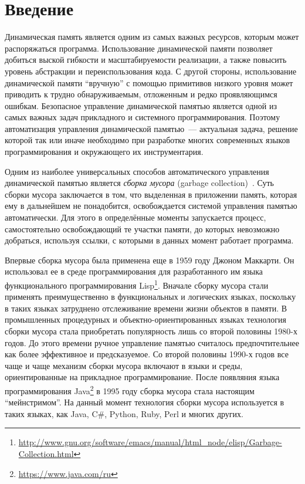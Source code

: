 \setcounter{page}{4}
\section*{Введение}

Динамическая память является одним из самых важных ресурсов, которым может распоряжаться программа. Использование
динамической памяти позволяет добиться выской гибкости и масштабируемости реализации, а также повысить уровень
абстракции и переиспользования кода. С другой стороны, использование динамической памяти ``вручную'' с помощью
примитивов низкого уровня может приводить к трудно обнаруживаемым, отложенным и редко проявляющимся ошибкам. 
Безопасное управление динамической памятью является одной из самых важных задач прикладного и системного программирования. 
Поэтому автоматизация управления динамической памятью~--- актуальная задача, решение которой так или иначе необходимо при
разработке многих современных языков программирования и окружающего их инструментария.

Одним из наиболее универсальных способов автоматического управления динамической памятью является \emph{сборка мусора} 
(garbage collection)~\cite{GCBook}. Суть сборки мусора заключается в том, что выделенная в приложении память, 
которая ему в дальнейшем не понадобится, освобождается системой управления памятью автоматически. Для этого в 
определённые моменты запускается процесс, самостоятельно освобождающий те участки памяти, до которых невозможно
добраться, используя ссылки, с которыми в данных момент работает программа.
 
Впервые сборка мусора была применена еще  в 1959 году Джоном Маккарти. Он использовал ее в среде программирования для 
разработанного им языка функционального программирования Lisp\footnote{\url{http://www.gnu.org/software/emacs/manual/html_node/elisp/Garbage-Collection.html}}.
Вначале сборку мусора стали применять преимущественно в функциональных и логических языках, поскольку в таких языках затруднено
отслеживание времени жизни объектов в памяти. В промышленных процедурных и объектно-ориентированных языках технология сборки мусора стала 
приобретать популярность лишь со второй половины 1980-х годов. До этого времени ручное управление памятью считалось предпочтительнее как более 
эффективное и предсказуемое. Со второй половины 1990-х годов все чаще и чаще механизм сборки мусора включают в языки и среды, ориентированные 
на прикладное программирование. После появляния языка программирования Java\footnote{\url{https://www.java.com/ru}} в 1995 году 
сборка мусора стала настоящим ``мейнстримом''.  На данный момент технология сборки мусора используется в таких языках, как Java, C\#, 
Python, Ruby, Perl и многих других. 

